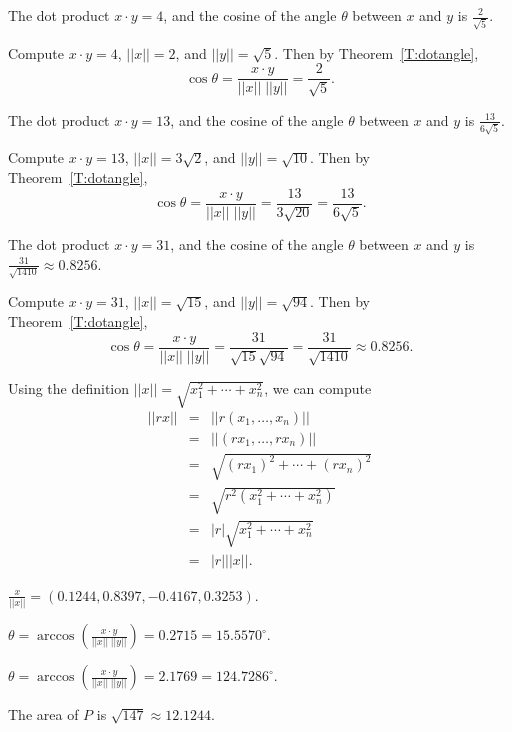 \documentclass{ximera}
\begin{document}
\newpage
{} \ans The dot product $x \cdot y = 4$, and the cosine
of the angle $\theta$ between $x$ and $y$ is $\frac{2}{\sqrt{5}}$.

\soln Compute $x \cdot y = 4$, $||x|| = 2$, and $||y|| = \sqrt{5}$.
Then by Theorem~\ref{T:dotangle},
\[
\cos\theta = \frac{x \cdot y}{||x||\;||y||} = \frac{2}{\sqrt{5}}.
\]

 \ans The dot product $x \cdot y = 13$, and the cosine
of the angle $\theta$ between $x$ and $y$ is $\frac{13}{6\sqrt{5}}$.

\soln Compute $x \cdot y = 13$, $||x|| = 3\sqrt{2}$, and $||y|| = \sqrt{10}$.
Then by Theorem~\ref{T:dotangle},
\[
\cos\theta = \frac{x \cdot y}{||x||\;||y||} = \frac{13}{3\sqrt{20}}
= \frac{13}{6\sqrt{5}}.
\]

 \ans The dot product $x \cdot y = 31$, and the cosine
of the angle $\theta$ between $x$ and $y$ is
$\frac{31}{\sqrt{1410}} \approx 0.8256$.

\soln Compute $x \cdot y = 31$, $||x|| = \sqrt{15}$, and $||y|| = \sqrt{94}$.
Then by Theorem~\ref{T:dotangle},
\[
\cos\theta = \frac{x \cdot y}{||x||\;||y||} = \frac{31}{\sqrt{15}\sqrt{94}}
= \frac{31}{\sqrt{1410}} \approx 0.8256.
\]

 Using the definition $||x|| = \sqrt{x_1^2 + \cdots + x_n^2}$,
we can compute
\[
\begin{array}{rcl}
||rx|| & = & ||r(x_1,\dots,x_n)|| \\
& = & ||(rx_1,\dots,rx_n)|| \\
& = & \sqrt{(rx_1)^2 + \cdots + (rx_n)^2} \\
& = & \sqrt{r^2(x_1^2 + \cdots + x_n^2)} \\
& = & |r|\sqrt{x_1^2 + \cdots + x_n^2} \\
& = & |r| ||x||.
\end{array}
\]


$\frac{x}{||x||} = (0.1244, 0.8397, -0.4167, 0.3253)$.

 $\theta =
\arccos \left(\frac{x \cdot y}{||x||\;||y||}\right) =
0.2715 = 15.5570^\circ$.

 $\theta =
\arccos \left(\frac{x \cdot y}{||x||\;||y||}\right) =
2.1769 = 124.7286^\circ$.

 \ans The area of $P$ is $\sqrt{147} \approx 12.1244$.
\end{document}
